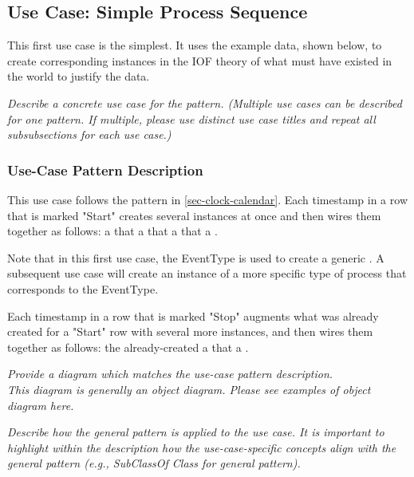 \subsection*{Use Case: Simple Process Sequence}\label{SimpleProcessSequence}
This first use case is the simplest. It uses the example data, shown below, to create corresponding instances in the IOF theory of what must have existed in the world to justify the data.

 \textit{ 
Describe a concrete use case for the pattern. (Multiple use cases can be described for one pattern. If multiple, please use distinct use case titles and repeat all subsubsections for each use case.)
  }

\newcommand{\ti}{\cname{bfo}{TemporalInstant }}

\subsubsection*{Use-Case Pattern Description}
This use case follows the pattern in \ref{sec-clock-calendar}.
Each timestamp in a row that is marked "Start" creates several instances at once and then wires them together as follows:
a  that  a \ti that  a  that  a .

Note that in this first use case, the EventType is used to create a generic . A subsequent use case will create an instance of a more specific type of process that corresponds to the EventType.

Each timestamp in a row that is marked "Stop" augments what was already created for a "Start" row with several more instances, and then wires them together as follows:
the already-created   a  that  a .

 \textit{ 
Provide a diagram which matches the use-case pattern description. \\
\noindent \textit{This diagram is generally an object diagram. Please see examples of object diagram here.}
  }

 \textit{ 
Describe how the general pattern is applied to the use case. It is important to highlight within the description how the use-case-specific concepts align with the general pattern (e.g., SubClassOf Class for general pattern).
  }

